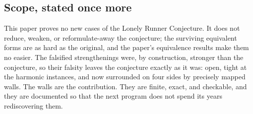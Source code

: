 \subsection{Scope, stated once more}

This paper proves no new cases of the Lonely Runner Conjecture. It does
not reduce, weaken, or reformulate-away the conjecture; the surviving
equivalent forms are as hard as the original, and the paper's
equivalence results make them no easier. The falsified strengthenings
were, by construction, stronger than the conjecture, so their falsity
leaves the conjecture exactly as it was: open, tight at the harmonic
instances, and now surrounded on four sides by precisely mapped walls.
The walls are the contribution. They are finite, exact, and checkable,
and they are documented so that the next program does not spend its
years rediscovering them.
